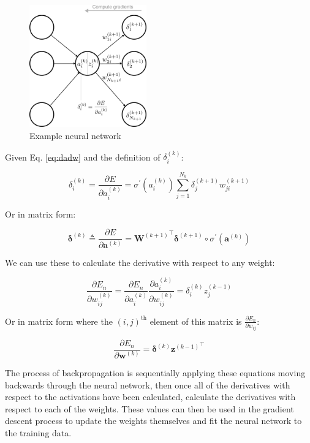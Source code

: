 \documentclass{article}
\begin{document}
\begin{figure}[h]
\centering
\includegraphics[width=0.45\textwidth]{./neural_networks_local_backpropagation.eps}
\caption{Example neural network}
\label{fig:backprop}
\end{figure}

Given Eq. \ref{eq:dadw} and the definition of $\delta_i^{(k)}$:

\begin{equation}
    \delta_i^{(k)} = \dfrac{\partial E}{\partial a_i^{(k)}} = \sigma^{'}(a_i^{(k)}) \sum\limits_{j=1}^{N_k} \delta_j^{(k+1)}w_{ji}^{(k+1)}
\end{equation}

Or in matrix form:

\begin{equation}
     \bm{\delta}^{(k)} \triangleq \dfrac{\partial E}{\partial \mathbf{a}^{(k)}} = {\mathbf{W}^{(k+1)}}^{\top} \bm{\delta}^{(k+1)} \circ \sigma^{'}(\mathbf{a}^{(k)}) 
\end{equation}

We can use these to calculate the derivative with respect to any weight:

\begin{equation}
    \dfrac{\partial E_n}{\partial w_{ij}^{(k)}} = 
    \dfrac{\partial E_n}{\partial a_i^{(k)}} \dfrac{\partial a_i^{(k)}}{\partial w_{ij}^{(k)}} = \delta_i^{(k)} z_j^{(k-1)}
\end{equation}

Or in matrix form where the $(i,j)^{\mathrm{th}}$ element of this matrix is $\frac{\partial E_n}{\partial w_{ij}}$:

\begin{equation}
    \dfrac{\partial E_n}{\partial \mathbf{w}^{(k)}} = \bm{\delta}^{(k)} {\mathbf{z}^{(k-1)}}^{\top}
\end{equation}

The process of backpropagation is sequentially applying these equations moving backwards through the neural network, then once all of the derivatives with respect to the activations have been calculated, calculate the derivatives with respect to each of the weights. These values can then be used in the gradient descent process to update the weights themselves and fit the neural network to the training data.
\end{document}
